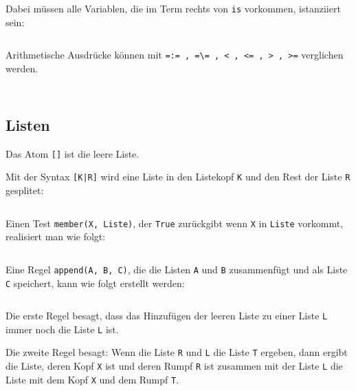 \inputminted[numbersep=5pt, tabsize=4]{prolog}{scripts/prolog/arithmetik.pl}

Dabei müssen alle Variablen, die im Term rechts von \texttt{is} vorkommen, 
istanziiert sein:

\inputminted[numbersep=5pt, tabsize=4]{prolog}{scripts/prolog/arithmetik-fail.pl}

Arithmetische Ausdrücke können mit \texttt{=:= , =\textbackslash= , < , <= , > , >=}
verglichen werden.

\begin{beispiel}
    \begin{bspenum}
        \item \inputminted[numbersep=5pt, tabsize=4]{prolog}{scripts/prolog/even.pl}
        \item \inputminted[numbersep=5pt, tabsize=4]{prolog}{scripts/prolog/fibonacci2.pl}
    \end{bspenum}
\end{beispiel}

\subsection{Listen}
Das Atom \texttt{[]} ist die leere Liste.

Mit der Syntax \texttt{[K|R]} wird eine Liste in den Listekopf \texttt{K} und
den Rest der Liste \texttt{R} gesplitet:

\inputminted[numbersep=5pt, tabsize=4]{prolog}{scripts/prolog/liste-basic.pl}

Einen Test \texttt{member(X, Liste)}, der \texttt{True} zurückgibt wenn \texttt{X}
in \texttt{Liste} vorkommt, realisiert man wie folgt:

\inputminted[numbersep=5pt, tabsize=4]{prolog}{scripts/prolog/liste-member.pl}

Eine Regel \texttt{append(A, B, C)}, die die Listen \texttt{A} und \texttt{B} 
zusammenfügt und als Liste \texttt{C} speichert, kann
wie folgt erstellt werden:

\inputminted[numbersep=5pt, tabsize=4]{prolog}{scripts/prolog/liste-append.pl}

Die erste Regel besagt, dass das Hinzufügen der leeren Liste zu einer Liste 
\texttt{L} immer noch die Liste \texttt{L} ist.

Die zweite Regel besagt: Wenn die Liste \texttt{R} und \texttt{L} die Liste \texttt{T}
ergeben, dann ergibt die Liste, deren Kopf \texttt{X} ist und deren Rumpf \texttt{R}
ist zusammen mit der Liste \texttt{L} die Liste mit dem Kopf \texttt{X} und dem
Rumpf \texttt{T}.

